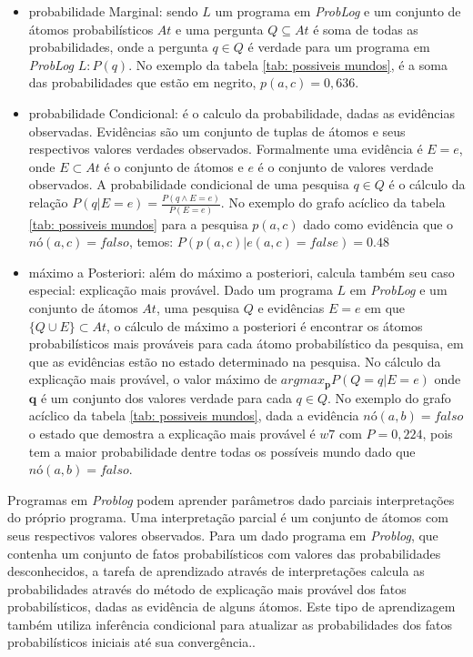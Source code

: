 \documentclass[
	12pt,				%
    oneside,			%
	a4paper,			%
	english,			%
	french,				%
	spanish,			%
	brazil,				%
	]{abntex2}
\begin{document}
\begin{itemize}
    \item probabilidade Marginal: sendo $L$ um programa em \textit{ProbLog} e um conjunto de átomos probabilísticos $At$ e uma pergunta $Q \subseteq At$ é soma de todas as probabilidades, onde a pergunta $q \in Q$ é verdade para um programa em \textit{ProbLog} $L: P(q)$. No exemplo da tabela \ref{tab: possiveis mundos}, é a soma das probabilidades que estão em negrito, $p(a, c)=0,636$.
    
    \item probabilidade Condicional: é o calculo da probabilidade, dadas as evidências observadas. Evidências são um conjunto de tuplas de átomos e seus respectivos valores verdades observados. Formalmente uma evidência é $E=e$, onde $E \subset At$ é o conjunto de átomos e $e$ é o conjunto de valores verdade observados. A probabilidade condicional de uma pesquisa $q \in Q$ é o cálculo da relação \(P(q|E=e)=\frac{P(q\wedge E=e)}{P(E=e)}\). No exemplo do grafo acíclico da tabela \ref{tab: possiveis mundos} para a pesquisa $p(a,c)$ dado como evidência que o $nó(a,c)=falso$, temos: $P(p(a, c)|e(a, c) = false) =0.48$ 
    
    \item máximo a Posteriori: além do máximo a posteriori, calcula também seu caso especial: explicação mais provável. Dado um programa $L$ em \textit{ProbLog} e um conjunto de átomos $At$, uma pesquisa $Q$ e evidências $E=e$ em que $\{Q \cup E\}\subset At$, o cálculo de máximo a posteriori é encontrar os átomos probabilísticos mais prováveis para cada átomo probabilístico da pesquisa, em que as evidências estão no estado determinado na pesquisa. No cálculo da explicação mais provável, o valor máximo de $argmax_\textbf{p}P(Q=q|E=e)$ onde $\textbf{q}$ é um conjunto dos valores verdade para cada $q\in Q$. No exemplo do grafo acíclico da tabela \ref{tab: possiveis mundos}, dada a evidência $nó(a,b)= falso$ o estado que demostra a explicação mais provável é $w7$ com $P=0,224$, pois tem a maior probabilidade dentre todas os possíveis mundo dado que $nó(a,b)= falso$.
    
\end{itemize} 

Programas em \textit{Problog} podem aprender parâmetros dado parciais interpretações do próprio programa. Uma interpretação parcial é um conjunto de átomos com seus respectivos valores observados. Para um dado programa em \textit{Problog}, que contenha um conjunto de fatos probabilísticos com valores das probabilidades desconhecidos, a tarefa de aprendizado através de interpretações calcula as probabilidades através do método de explicação mais provável dos fatos probabilísticos, dadas as evidência de alguns átomos. Este tipo de aprendizagem também utiliza inferência condicional para atualizar as probabilidades dos fatos probabilísticos iniciais até sua convergência..
\end{document}
